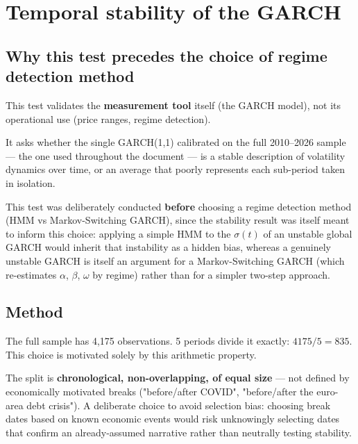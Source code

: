\documentclass[12pt,a4paper]{article}
\begin{document}
\newpage

\section{Temporal stability of the GARCH}
\label{sec:garch-stability}

\subsection{Why this test precedes the choice of regime \\ detection method}

This test validates the \textbf{measurement tool} itself (the GARCH model),
not its operational use (price ranges, regime detection).

It asks whether the single GARCH(1,1) calibrated on the full 2010--2026 sample
--- the one used throughout the document --- is a
stable description of volatility dynamics over time, or an average that poorly represents each sub-period taken in isolation.

This test was deliberately conducted \textbf{before} choosing a regime detection method (HMM vs Markov-Switching GARCH), since the stability result was itself meant to inform this choice: applying a simple HMM to the \textbf{$\sigma(t)$} of an unstable global GARCH would inherit that instability as a hidden bias, whereas a genuinely unstable GARCH is itself an argument for a Markov-Switching GARCH (which re-estimates $\alpha$, $\beta$, $\omega$ by regime) rather than for a
simpler two-step approach.

\subsection{Method}

The full sample has 4,175 observations. 5 periods divide it exactly: $4175/5 = 835$. This choice is motivated solely by this arithmetic property.

The split is \textbf{chronological, non-overlapping, of equal
	size} --- not defined by economically motivated breaks
("before/after COVID", "before/after the euro-area debt
crisis"). A deliberate choice to avoid selection bias:
choosing break dates based on known economic events would risk
unknowingly selecting dates that confirm an
already-assumed narrative rather than neutrally testing stability.
\end{document}
